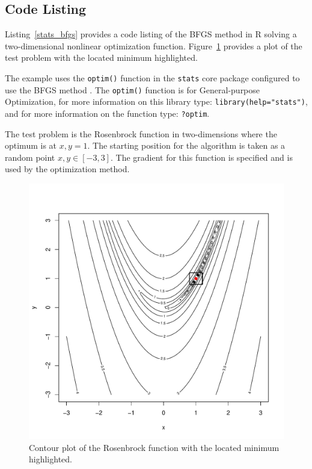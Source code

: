 \subsection{Code Listing}
Listing~\ref{stats_bfgs} provides a code listing of the BFGS method in R solving a two-dimensional nonlinear optimization function. Figure~\ref{plot:bfgs_result} provides a plot of the test problem with the located minimum highlighted.

The example uses the \texttt{optim()} function in the \texttt{stats} core package configured to use the BFGS method \cite{RDCT2011a}. The \texttt{optim()} function is for General-purpose Optimization, for more information on this library type: \texttt{library(help="stats")}, and for more information on the function type: \texttt{?optim}.

The test problem is the Rosenbrock function in two-dimensions where the optimum is at $x,y=1$. The starting position for the algorithm is taken as a random point $x,y \in [-3,3]$. The gradient for this function is specified and is used by the optimization method.




\begin{figure}[htp]
\centering
\includegraphics[scale=0.45]{a_optimization/bfgs_result.pdf}
\caption{Contour plot of the Rosenbrock function with the located minimum highlighted.}
\label{plot:bfgs_result}
\end{figure}

